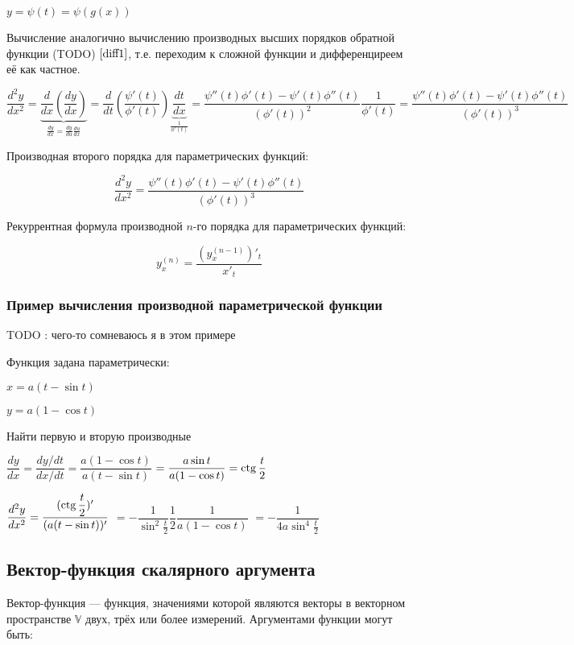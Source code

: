 $ y = \psi(t) = \psi( g(x) ) $

Вычисление аналогично вычислению производных высших порядков обратной функции (TODO) $ \ref{diff1} $,
т.е. переходим к сложной функции и дифференциреем её как частное.

$ \dfrac{d^{2}y}{dx^{2}} = 
\underbrace{
\dfrac{d}{dx} 
\left( \dfrac{dy}{dx} \right)
}_{\frac{dy}{dx} = \frac{dy}{du}\frac{du}{dx}} =
\dfrac{d}{dt} 
\left( 
\dfrac{\psi'(t)}{\phi'(t)} 
\right)
\underbrace{
\dfrac{dt}{dx}
}_{\frac{1}{\phi'(t)}} =
\dfrac{ \psi''(t)\phi'(t)-\psi'(t)\phi''(t)  }{(\phi'(t))^{2}}
\dfrac{1}{\phi'(t)}
=
\dfrac{ \psi''(t)\phi'(t)-\psi'(t)\phi''(t)  }{(\phi'(t))^{3}}
$

Производная второго порядка для параметрических функций:

$$
\dfrac{d^{2}y}{dx^{2}}
=
\dfrac{ \psi''(t)\phi'(t)-\psi'(t)\phi''(t)  }{(\phi'(t))^{3}}
$$

Рекуррентная формула производной $n$-го порядка для параметрических функций:

$$
y^{(n)}_x = \dfrac{ (y^{(n-1)}_x)'_t }{x'_t}
$$


\subsubsection{Пример вычисления производной параметрической функции}

TODO : чего-то сомневаюсь я в этом примере

Функция задана параметрически:

$ x = a(t - \sin t) $

$ y = a(1 - \cos t) $

Найти первую и вторую производные

$ \dfrac{dy}{dx} = \dfrac{dy/dt}{dx/dt} = \dfrac{a(1 - \cos t) }{a(t - \sin t)}$
$ = \dfrac{ a\sin t }{a(1 - \cos t)} = \operatorname{ctg} \dfrac{t}{2} $

$ \dfrac{d^{2}y}{dx^{2}} = \dfrac{(\operatorname{ctg} \dfrac{t}{2})'}{ (a(t - \sin t))' } $
$ = - \dfrac{1}{\sin^{2} \frac{t}{2} } \dfrac{1}{2}  \dfrac{1}{a(1 - \cos t)}$
$ = - \dfrac{1}{4a \sin^{4} \frac{t}{2}} $


\subsection{Вектор-функция скалярного аргумента}

Вектор-функция — функция, значениями которой являются векторы в векторном пространстве $\mathbb V$ двух, трёх или более измерений.
Аргументами функции могут быть:

